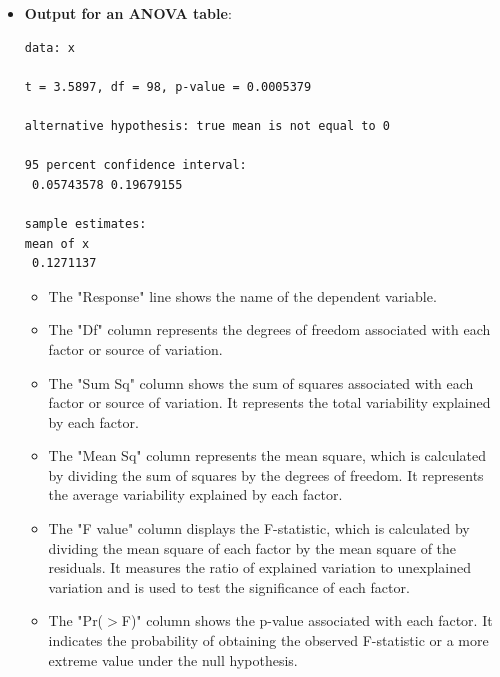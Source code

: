 \documentclass[12pt]{book}
\begin{document}
\begin{itemize}
\item \textbf{Output for an ANOVA table}:

\begin{mdframed}[backgroundcolor=gray!15, linecolor=black]
\begin{verbatim}
data: x

t = 3.5897, df = 98, p-value = 0.0005379

alternative hypothesis: true mean is not equal to 0

95 percent confidence interval:
 0.05743578 0.19679155

sample estimates:
mean of x
 0.1271137
\end{verbatim}
\end{mdframed}

\begin{itemize}
\item The "Response" line shows the name of the dependent variable.
\item The "Df" column represents the degrees of freedom associated with each factor or source of variation.
\item The "Sum Sq" column shows the sum of squares associated with each factor or source of variation. It represents the total variability explained by each factor.
\item The "Mean Sq" column represents the mean square, which is calculated by dividing the sum of squares by the degrees of freedom. It represents the average variability explained by each factor.
\item The "F value" column displays the F-statistic, which is calculated by dividing the mean square of each factor by the mean square of the residuals. It measures the ratio of explained variation to unexplained variation and is used to test the significance of each factor.
\item The "Pr($>$F)" column shows the p-value associated with each factor. It indicates the probability of obtaining the observed F-statistic or a more extreme value under the null hypothesis.
\end{itemize}
\end{itemize}

\newpage

\pagestyle{fancy}
\end{document}
